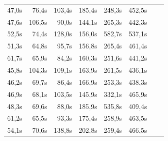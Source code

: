\documentclass{scrartcl}
\begin{document}
\begin{table}[h]
\begin{tabular}{@{}llllllll@{}}
\multicolumn{1}{r}{47,0s}       & \multicolumn{1}{r}{76,4s}       & \multicolumn{1}{r}{103,4s}       & \multicolumn{1}{r}{185,4s}       & \multicolumn{1}{r}{248,3s}       & \multicolumn{1}{r}{452,5s}        \\
\multicolumn{1}{r}{47,6s}       & \multicolumn{1}{r}{106,5s}      & \multicolumn{1}{r}{90,0s}        & \multicolumn{1}{r}{144,1s}       & \multicolumn{1}{r}{265,3s}       & \multicolumn{1}{r}{442,3s}        \\
\multicolumn{1}{r}{52,5s}       & \multicolumn{1}{r}{74,4s}       & \multicolumn{1}{r}{128,0s}       & \multicolumn{1}{r}{156,0s}       & \multicolumn{1}{r}{582,7s}       & \multicolumn{1}{r}{537,1s}        \\
\multicolumn{1}{r}{51,3s}       & \multicolumn{1}{r}{64,8s}       & \multicolumn{1}{r}{95,7s}        & \multicolumn{1}{r}{156,8s}       & \multicolumn{1}{r}{265,4s}       & \multicolumn{1}{r}{461,4s}        \\
\multicolumn{1}{r}{61,7s}       & \multicolumn{1}{r}{65,9s}       & \multicolumn{1}{r}{84,2s}        & \multicolumn{1}{r}{160,3s}       & \multicolumn{1}{r}{251,6s}       & \multicolumn{1}{r}{441,2s}        \\
\multicolumn{1}{r}{45,8s}       & \multicolumn{1}{r}{104,3s}      & \multicolumn{1}{r}{109,1s}       & \multicolumn{1}{r}{163,9s}       & \multicolumn{1}{r}{261,5s}       & \multicolumn{1}{r}{436,1s}        \\
\multicolumn{1}{r}{46,2s}       & \multicolumn{1}{r}{69,7s}       & \multicolumn{1}{r}{86,4s}        & \multicolumn{1}{r}{166,9s}       & \multicolumn{1}{r}{253,3s}       & \multicolumn{1}{r}{438,3s}        \\
\multicolumn{1}{r}{46,9s}       & \multicolumn{1}{r}{68,1s}       & \multicolumn{1}{r}{103,5s}       & \multicolumn{1}{r}{145,9s}       & \multicolumn{1}{r}{332,1s}       & \multicolumn{1}{r}{465,9s}        \\
\multicolumn{1}{r}{48,3s}       & \multicolumn{1}{r}{69,6s}       & \multicolumn{1}{r}{88,0s}        & \multicolumn{1}{r}{185,9s}       & \multicolumn{1}{r}{535,8s}       & \multicolumn{1}{r}{409,4s}        \\
\multicolumn{1}{r}{61,2s}       & \multicolumn{1}{r}{65,5s}       & \multicolumn{1}{r}{93,3s}        & \multicolumn{1}{r}{175,4s}       & \multicolumn{1}{r}{258,9s}       & \multicolumn{1}{r}{463,5s}        \\
\multicolumn{1}{r}{54,1s}       & \multicolumn{1}{r}{70,6s}       & \multicolumn{1}{r}{138,8s}       & \multicolumn{1}{r}{202,8s}       & \multicolumn{1}{r}{259,4s}       & \multicolumn{1}{r}{466,5s}        \\

\end{tabular}
\end{table}
\end{document}
